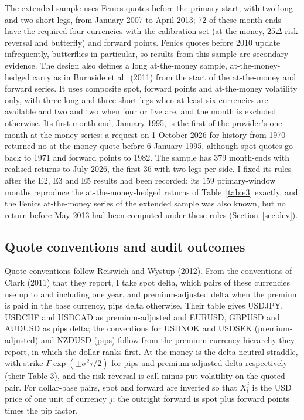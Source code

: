 \documentclass[11pt]{article}
\theoremstyle{result}
\newcommand{\D}{\Delta}
\begin{document}
The extended sample uses Fenics quotes before the primary start, with two long and two short legs, from January 2007 to April 2013; 72 of these month-ends have the required four currencies with the calibration set (at-the-money, $25\D$ risk reversal and butterfly) and forward points. Fenics quotes before 2010 update infrequently, butterflies in particular, so results from this sample are secondary evidence. The design also defines a long at-the-money sample, at-the-money-hedged carry as in Burnside et al.\ (2011) from the start of the at-the-money and forward series. It uses composite spot, forward points and at-the-money volatility only, with three long and three short legs when at least six currencies are available and two and two when four or five are, and the month is excluded otherwise. Its first month-end, January 1995, is the first of the provider's one-month at-the-money series: a request on 1 October 2026 for history from 1970 returned no at-the-money quote before 6 January 1995, although spot quotes go back to 1971 and forward points to 1982. The sample has 379 month-ends with realised returns to July 2026, the first 36 with two legs per side. I fixed its rules after the E2, E3 and E5 results had been recorded: its 159 primary-window months reproduce the at-the-money-hedged returns of Table~\ref{tab:e3} exactly, and the Fenics at-the-money series of the extended sample was also known, but no return before May 2013 had been computed under these rules (Section~\ref{sec:dev}).

\subsection{Quote conventions and audit outcomes}

Quote conventions follow Reiswich and Wystup (2012). From the conventions of Clark (2011) that they report, I take spot delta, which pairs of these currencies use up to and including one year, and premium-adjusted delta when the premium is paid in the base currency, pips delta otherwise. Their table gives USDJPY, USDCHF and USDCAD as premium-adjusted and EURUSD, GBPUSD and AUDUSD as pips delta; the conventions for USDNOK and USDSEK (premium-adjusted) and NZDUSD (pips) follow from the premium-currency hierarchy they report, in which the dollar ranks first. At-the-money is the delta-neutral straddle, with strike $F\exp(\pm\sigma^2\tau/2)$ for pips and premium-adjusted delta respectively (their Table 3), and the risk reversal is call minus put volatility on the quoted pair. For dollar-base pairs, spot and forward are inverted so that $X^j_t$ is the USD price of one unit of currency $j$; the outright forward is spot plus forward points times the pip factor.
\end{document}
